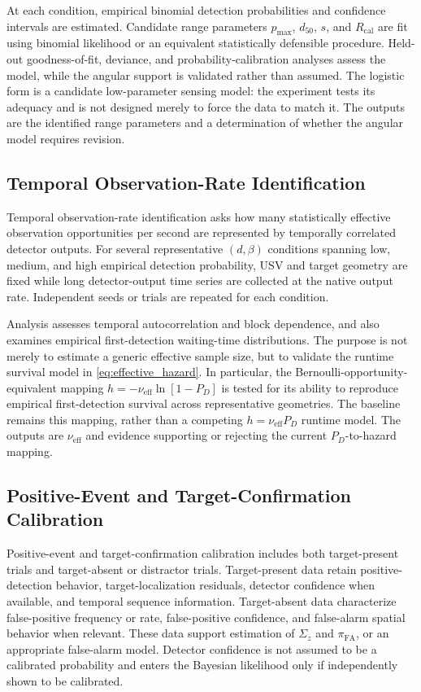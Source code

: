 \documentclass[letterpaper, 10pt, conference]{ieeeconf}
\begin{document}
At each condition, empirical binomial detection probabilities and confidence intervals are estimated. Candidate range parameters \(p_{\max}\), \(d_{50}\), \(s\), and \(R_{\mathrm{cal}}\) are fit using binomial likelihood or an equivalent statistically defensible procedure. Held-out goodness-of-fit, deviance, and probability-calibration analyses assess the model, while the angular support is validated rather than assumed. The logistic form is a candidate low-parameter sensing model: the experiment tests its adequacy and is not designed merely to force the data to match it. The outputs are the identified range parameters and a determination of whether the angular model requires revision.

\subsection{Temporal Observation-Rate Identification}

Temporal observation-rate identification asks how many statistically effective observation opportunities per second are represented by temporally correlated detector outputs. For several representative \((d,\beta)\) conditions spanning low, medium, and high empirical detection probability, USV and target geometry are fixed while long detector-output time series are collected at the native output rate. Independent seeds or trials are repeated for each condition.

Analysis assesses temporal autocorrelation and block dependence, and also examines empirical first-detection waiting-time distributions. The purpose is not merely to estimate a generic effective sample size, but to validate the runtime survival model in \eqref{eq:effective_hazard}. In particular, the Bernoulli-opportunity-equivalent mapping \(h=-\nu_{\mathrm{eff}}\ln[1-P_D]\) is tested for its ability to reproduce empirical first-detection survival across representative geometries. The baseline remains this mapping, rather than a competing \(h=\nu_{\mathrm{eff}}P_D\) runtime model. The outputs are \(\nu_{\mathrm{eff}}\) and evidence supporting or rejecting the current \(P_D\)-to-hazard mapping.

\subsection{Positive-Event and Target-Confirmation Calibration}

Positive-event and target-confirmation calibration includes both target-present trials and target-absent or distractor trials. Target-present data retain positive-detection behavior, target-localization residuals, detector confidence when available, and temporal sequence information. Target-absent data characterize false-positive frequency or rate, false-positive confidence, and false-alarm spatial behavior when relevant. These data support estimation of \(\Sigma_z\) and \(\pi_{\mathrm{FA}}\), or an appropriate false-alarm model. Detector confidence is not assumed to be a calibrated probability and enters the Bayesian likelihood only if independently shown to be calibrated.
\end{document}
